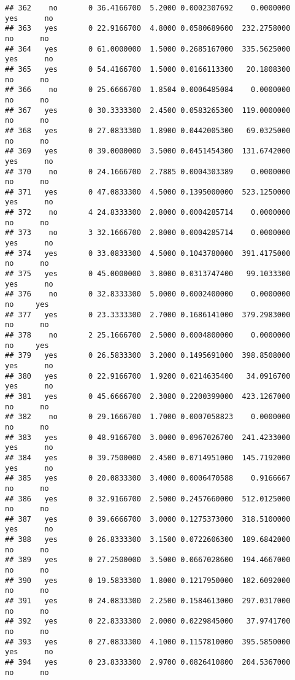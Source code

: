 \documentclass[]{article}
\begin{document}
\begin{verbatim}
## 362    no       0 36.4166700  5.2000 0.0002307692    0.0000000   yes      no
## 363   yes       0 22.9166700  4.8000 0.0580689600  232.2758000    no      no
## 364   yes       0 61.0000000  1.5000 0.2685167000  335.5625000   yes      no
## 365   yes       0 54.4166700  1.5000 0.0166113300   20.1808300    no      no
## 366    no       0 25.6666700  1.8504 0.0006485084    0.0000000    no      no
## 367   yes       0 30.3333300  2.4500 0.0583265300  119.0000000    no      no
## 368   yes       0 27.0833300  1.8900 0.0442005300   69.0325000    no      no
## 369   yes       0 39.0000000  3.5000 0.0451454300  131.6742000   yes      no
## 370    no       0 24.1666700  2.7885 0.0004303389    0.0000000    no      no
## 371   yes       0 47.0833300  4.5000 0.1395000000  523.1250000   yes      no
## 372    no       4 24.8333300  2.8000 0.0004285714    0.0000000    no      no
## 373    no       3 32.1666700  2.8000 0.0004285714    0.0000000   yes      no
## 374   yes       0 33.0833300  4.5000 0.1043780000  391.4175000    no      no
## 375   yes       0 45.0000000  3.8000 0.0313747400   99.1033300   yes      no
## 376    no       0 32.8333300  5.0000 0.0002400000    0.0000000    no     yes
## 377   yes       0 23.3333300  2.7000 0.1686141000  379.2983000    no      no
## 378    no       2 25.1666700  2.5000 0.0004800000    0.0000000    no     yes
## 379   yes       0 26.5833300  3.2000 0.1495691000  398.8508000   yes      no
## 380   yes       0 22.9166700  1.9200 0.0214635400   34.0916700   yes      no
## 381   yes       0 45.6666700  2.3080 0.2200399000  423.1267000    no      no
## 382    no       0 29.1666700  1.7000 0.0007058823    0.0000000    no      no
## 383   yes       0 48.9166700  3.0000 0.0967026700  241.4233000   yes      no
## 384   yes       0 39.7500000  2.4500 0.0714951000  145.7192000   yes      no
## 385   yes       0 20.0833300  3.4000 0.0006470588    0.9166667    no      no
## 386   yes       0 32.9166700  2.5000 0.2457660000  512.0125000    no      no
## 387   yes       0 39.6666700  3.0000 0.1275373000  318.5100000   yes      no
## 388   yes       0 26.8333300  3.1500 0.0722606300  189.6842000    no      no
## 389   yes       0 27.2500000  3.5000 0.0667028600  194.4667000    no      no
## 390   yes       0 19.5833300  1.8000 0.1217950000  182.6092000    no      no
## 391   yes       0 24.0833300  2.2500 0.1584613000  297.0317000    no      no
## 392   yes       0 22.8333300  2.0000 0.0229845000   37.9741700    no      no
## 393   yes       0 27.0833300  4.1000 0.1157810000  395.5850000   yes      no
## 394   yes       0 23.8333300  2.9700 0.0826410800  204.5367000    no      no

\end{verbatim}
\end{document}
